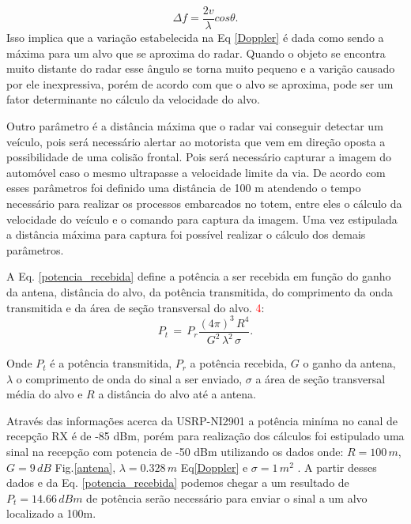  \begin{equation}\label{Doppler2} 
  \Delta f =  \frac{2v}{\lambda}cos \theta.
\end{equation}
Isso implica que a variação estabelecida na Eq \ref{Doppler} é dada como sendo a máxima para um alvo que se aproxima do radar. Quando o objeto se encontra muito distante do radar esse ângulo se torna muito pequeno e a varição causado por ele inexpressiva, porém de acordo com que o alvo se aproxima, pode ser um fator determinante no cálculo da velocidade do alvo.

Outro parâmetro é a distância máxima que o radar vai conseguir detectar um veículo, pois será necessário alertar ao motorista que vem em direção oposta a possibilidade de uma colisão frontal. Pois será necessário capturar a imagem do automóvel caso o mesmo ultrapasse a velocidade limite da via. De acordo com esses parâmetros foi definido uma distância de 100 m atendendo o tempo necessário para realizar os processos embarcados no totem, entre eles o cálculo da velocidade do veículo e o comando para captura da imagem. Uma vez estipulada a distância máxima para captura foi possível realizar o cálculo dos demais parâmetros.

A Eq. \ref{potencia_recebida} define a potência a ser recebida em função do ganho da antena, distância do alvo, da potência transmitida, do comprimento da onda transmitida e da área de seção transversal do alvo. \textcolor{red}{4}\cite{Richards}:
\begin{equation}\label{potencia_recebida}
    P_t\, =\,   P_r \frac{(4\pi)^{3}\,  R^{4}}{G^{2}\,   \lambda^{2}\, \sigma }.
\end{equation}%

Onde $P_t$ é a potência transmitida, $P_r$ a potência recebida, $G$ o ganho da antena, $\lambda$ o comprimento de onda do sinal a ser enviado, $\sigma$ a área de seção transversal média do alvo e $R$ a distância do alvo até a antena.

Através das informações acerca da USRP-NI2901 \cite{RDS}  a potência miníma no canal de recepção RX é de -85 dBm, porém para realização dos cálculos foi estipulado uma sinal na recepção com potencia de -50 dBm utilizando os dados onde: $R=100 \, m$, $G=9 \, dB$ Fig.\ref{antena}, $\lambda=0.328 \, m$ Eq\ref{Doppler} e $\sigma=1 \, m^{2}$ \cite{Richards}. A partir desses dados e da Eq. \ref{potencia_recebida} podemos chegar a um resultado de $P_t=14.66 \, dBm$ de potência serão necessário para enviar o sinal a um alvo localizado a 100m.

